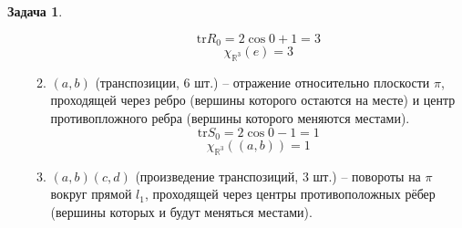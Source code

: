\documentclass[12pt]{article}
\theoremstyle{definition}
\newtheorem{zad}{Задача}[section]
\begin{document}
\begin{zad}
\begin{itemize}
\begin{enumerate}
        \begin{equation}
            \text{tr}R_0=2\cos 0+1=3
        \end{equation}
        \begin{equation}
            \boxed{\chi_{\mathbb{R}^3}(e)=3}
        \end{equation}
        \item $(a,b)$ (транспозиции, 6 шт.) -- отражение относительно плоскости $\pi$, проходящей через ребро (вершины которого остаются на месте) и центр противопложного ребра (вершины которого меняются местами).
        \begin{equation}
            \text{tr}S_0=2\cos 0-1=1
        \end{equation}
        \begin{equation}
            \boxed{\chi_{\mathbb{R}^3}((a,b))=1}
        \end{equation}
        \item $(a,b)(c,d)$ (произведение транспозиций, 3 шт.) -- повороты на $\pi$ вокруг прямой $l_1$, проходящей через центры противоположных рёбер (вершины которых и будут меняться местами).
        \begin{equation}

\end{equation}
\end{enumerate}
\end{itemize}
\end{zad}
\end{document}
